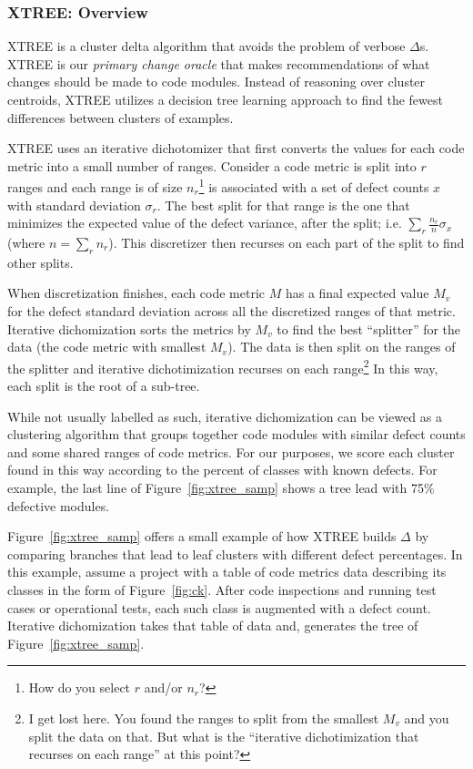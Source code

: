 \documentclass[twocolumn,5p]{elsarticle}
\newcommand{\fig}[1]{Figure~\ref{fig:#1}}
\theoremstyle{break}
\begin{document}
\subsubsection{XTREE: Overview}

  XTREE  is a cluster delta algorithm
  that avoids the problem of verbose $\Delta$s.
  XTREE is our {\em primary change oracle} that makes recommendations 
  of what changes should be made to code modules.
  Instead of reasoning over cluster centroids,
  XTREE utilizes a decision tree learning approach
  to find the fewest differences between clusters of examples.
  
  
 XTREE uses an iterative dichotomizer that
first converts the values for each code
metric into a small number of ranges.
Consider a code metric is split into $r$ ranges and each range is of
  size
    $n_r$\footnote{How do you select $r$ and/or $n_r$?} is
  associated with a set of defect counts $x$ with standard deviation
  $\sigma_r$.
  The best split for that range is
  the one that minimizes the expected value of the
  defect variance, after the split; i.e.
  $\sum_r\frac{n_r}{n}\sigma_x$ (where $n=\sum_r n_r$).
  This discretizer then recurses on each part of the split
  to find other splits. 
  
  When discretization finishes, each code metric $M$ has a 
  final expected value $M_v$ for the defect standard deviation 
  across all the discretized ranges of that metric.
  Iterative dichomization sorts the metrics by $M_v$
  to find the best ``splitter'' for the data
  (the code metric with smallest $M_v$). The data
  is then split on the ranges of the splitter and
  iterative dichotimization recurses on each range\footnote{I get lost here. You found the ranges to split from the smallest $M_v$ and you split the data on that. But what is the ``iterative dichotimization that recurses on each range'' at this point?}  In this way,
  each split is the root of a sub-tree.

 
  While not usually labelled as such, iterative dichomization can
  be viewed as a clustering algorithm that groups together code modules
  with similar defect counts and some shared ranges of code metrics.
  For our purposes, we score each cluster found in this way according
  to the percent of classes with known defects. For example,
  the last line of \fig{xtree_samp} shows a tree lead with 75\%
  defective modules.
  
 \fig{xtree_samp} offers
  a small example of how XTREE builds
    $\Delta$ by comparing branches that lead to leaf clusters
  with different defect percentages. In this example, assume a project with a table of code metrics data describing its classes in the form of \fig{ck}. After code inspections and running test cases or operational
      tests, each such class is augmented with a defect count.
      Iterative dichomization takes that table of data and, 
        generates the tree of \fig{xtree_samp}.
        
\end{document}
